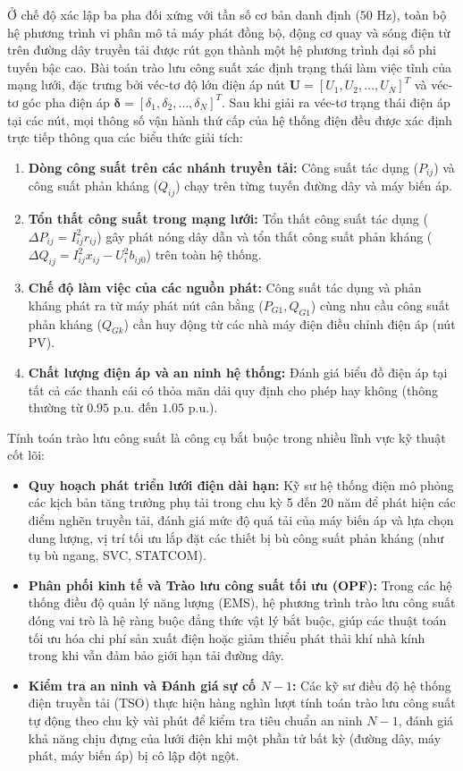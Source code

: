 \documentclass[12pt,a4paper,oneside]{report}
\begin{document}
Ở chế độ xác lập ba pha đối xứng với tần số cơ bản danh định ($50\text{ Hz}$), toàn bộ hệ phương trình vi phân mô tả máy phát đồng bộ, động cơ quay và sóng điện từ trên đường dây truyền tải được rút gọn thành một hệ phương trình đại số phi tuyến bậc cao. Bài toán trào lưu công suất xác định trạng thái làm việc tĩnh của mạng lưới, đặc trưng bởi véc-tơ độ lớn điện áp nút $\mathbf{U} = [U_1, U_2, \dots, U_N]^T$ và véc-tơ góc pha điện áp $\boldsymbol{\delta} = [\delta_1, \delta_2, \dots, \delta_N]^T$. Sau khi giải ra véc-tơ trạng thái điện áp tại các nút, mọi thông số vận hành thứ cấp của hệ thống điện đều được xác định trực tiếp thông qua các biểu thức giải tích:
\begin{enumerate}
    \item \textbf{Dòng công suất trên các nhánh truyền tải:} Công suất tác dụng ($P_{ij}$) và công suất phản kháng ($Q_{ij}$) chạy trên từng tuyến đường dây và máy biến áp.
    \item \textbf{Tổn thất công suất trong mạng lưới:} Tổn thất công suất tác dụng ($\Delta P_{ij} = I_{ij}^2 r_{ij}$) gây phát nóng dây dẫn và tổn thất công suất phản kháng ($\Delta Q_{ij} = I_{ij}^2 x_{ij} - U_i^2 b_{ij0}$) trên toàn hệ thống.
    \item \textbf{Chế độ làm việc của các nguồn phát:} Công suất tác dụng và phản kháng phát ra từ máy phát nút cân bằng ($P_{G1}, Q_{G1}$) cùng nhu cầu công suất phản kháng ($Q_{Gk}$) cần huy động từ các nhà máy điện điều chỉnh điện áp (nút PV).
    \item \textbf{Chất lượng điện áp và an ninh hệ thống:} Đánh giá biểu đồ điện áp tại tất cả các thanh cái có thỏa mãn dải quy định cho phép hay không (thông thường từ $0.95\text{ p.u.}$ đến $1.05\text{ p.u.}$).
\end{enumerate}

Tính toán trào lưu công suất là công cụ bắt buộc trong nhiều lĩnh vực kỹ thuật cốt lõi:
\begin{itemize}
    \item \textbf{Quy hoạch phát triển lưới điện dài hạn:} Kỹ sư hệ thống điện mô phỏng các kịch bản tăng trưởng phụ tải trong chu kỳ 5 đến 20 năm để phát hiện các điểm nghẽn truyền tải, đánh giá mức độ quá tải của máy biến áp và lựa chọn dung lượng, vị trí tối ưu lắp đặt các thiết bị bù công suất phản kháng (như tụ bù ngang, SVC, STATCOM).
    \item \textbf{Phân phối kinh tế và Trào lưu công suất tối ưu (OPF):} Trong các hệ thống điều độ quản lý năng lượng (EMS), hệ phương trình trào lưu công suất đóng vai trò là hệ ràng buộc đẳng thức vật lý bắt buộc, giúp các thuật toán tối ưu hóa chi phí sản xuất điện hoặc giảm thiểu phát thải khí nhà kính trong khi vẫn đảm bảo giới hạn tải đường dây.
    \item \textbf{Kiểm tra an ninh và Đánh giá sự cố $N-1$:} Các kỹ sư điều độ hệ thống điện truyền tải (TSO) thực hiện hàng nghìn lượt tính toán trào lưu công suất tự động theo chu kỳ vài phút để kiểm tra tiêu chuẩn an ninh $N-1$, đánh giá khả năng chịu đựng của lưới điện khi một phần tử bất kỳ (đường dây, máy phát, máy biến áp) bị cô lập đột ngột.
\end{itemize}
\end{document}
